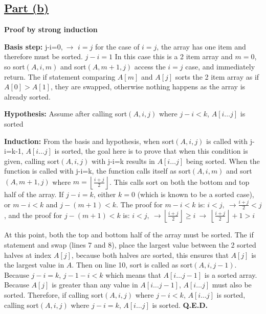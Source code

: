 \documentclass{article}
\begin{document}
\subsection*{\underline{Part (b)}}
\textbf{Proof by strong induction}

\textbf{Basis step:} j-i=0,$\ \rightarrow$ $i=j$ for the case of $i=j$, the array has one item and therefore must be sorted.
$j-i=1$ In this case this is a 2 item array and $m = 0$, so sort$(A, i, m)$ and sort$(A, m+1, j)$ access the $i=j$ case, and immediately return. The if statement comparing $A[m]$ and $A[j]$ sorts the 2 item array as if $A[0] > A[1]$, they are swapped, otherwise nothing happens as the array is already sorted.

\textbf{Hypothesis:} Assume after calling sort$(A, i, j)$ where $j-i<k$, $A[i\dots j]$ is sorted

\textbf{Induction:} From the basis and hypothesis, when sort$(A, i, j)$ is called with j-i=k-1, $A[i\dots j]$ is sorted, the goal here is to prove that when this condition is given, calling sort$(A, i, j)$ with j-i=k results in $A[i\dots j]$ being sorted.
When the function is called with j-i=k, the function calls itself as sort$(A, i, m)$ and sort$(A, m+1, j)$ where $ m=\left\lfloor\frac{i+j}{2}\right\rfloor$. This calls sort on both the bottom and top half of the array. If $j-i=k$, either $k = 0$ (which is known to be a sorted case), or $m-i<k$ and $j-\left(m+1\right)<k$. The proof for $m-i<k$ is: $i<j,\ \rightarrow\frac{i+j}{2}<j$, and the proof for $j-\left(m+1\right)<k$ is: $i<j,\ \rightarrow\left\lfloor\frac{i+j}{2}\right\rfloor\geq i\ \rightarrow\ \left\lfloor\frac{i+j}{2}\right\rfloor+1>i\ $

At this point, both the top and bottom half of the array must be sorted. The if statement and swap (lines 7 and 8), place the largest value between the 2 sorted halves at index $A[j]$, because both halves are sorted, this ensures that $A[j]$ is the largest value in $A$. Then on line 10, sort is called as sort$(A, i, j-1)$. Because $j-i=k$, $j-1-i<k$ which means that $A[i \dots j-1]$ is a sorted array. Because $A[j]$ is greater than any value in $A[i \dots j-1]$, $A[i \dots j]$ must also be sorted.
Therefore, if calling sort$(A, i, j)$ where $j-i<k$, $A[i \dots j]$ is sorted, calling sort$(A, i, j)$ where $j-i=k$, $A[i \dots j]$ is sorted.
\textbf{Q.E.D.}

\newpage
\section{}
\end{document}
